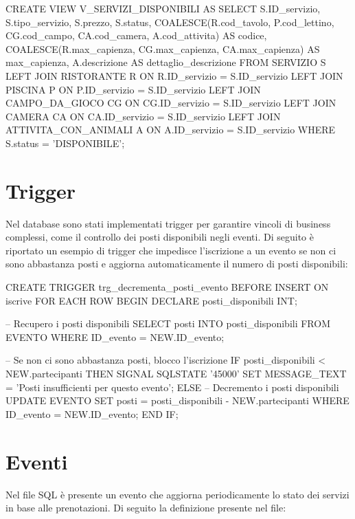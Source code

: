 \documentclass[a4paper,12pt]{report}
\begin{document}
\begin{sqlcode}[caption={},label={lst:view}]
CREATE VIEW V_SERVIZI_DISPONIBILI AS
SELECT
S.ID_servizio,
S.tipo_servizio,
S.prezzo,
S.status,
COALESCE(R.cod_tavolo, P.cod_lettino, CG.cod_campo, CA.cod_camera, A.cod_attivita) AS codice,
COALESCE(R.max_capienza, CG.max_capienza, CA.max_capienza) AS max_capienza,
A.descrizione AS dettaglio_descrizione
FROM SERVIZIO S
LEFT JOIN RISTORANTE R ON R.ID_servizio = S.ID_servizio
LEFT JOIN PISCINA P ON P.ID_servizio = S.ID_servizio
LEFT JOIN CAMPO_DA_GIOCO CG ON CG.ID_servizio = S.ID_servizio
LEFT JOIN CAMERA CA ON CA.ID_servizio = S.ID_servizio
LEFT JOIN ATTIVITA_CON_ANIMALI A ON A.ID_servizio = S.ID_servizio
WHERE S.status = 'DISPONIBILE';
\end{sqlcode}

\section{Trigger}

Nel database sono stati implementati trigger per garantire vincoli di business complessi, come il controllo dei posti disponibili
negli eventi. Di seguito è riportato un esempio di trigger che impedisce l'iscrizione a un evento se non ci sono abbastanza posti
e aggiorna automaticamente il numero di posti disponibili:

\begin{sqlcode}[caption={},label={lst:trigger}]
CREATE TRIGGER trg_decrementa_posti_evento
BEFORE INSERT ON iscrive
FOR EACH ROW
BEGIN
DECLARE posti_disponibili INT;

-- Recupero i posti disponibili
SELECT posti
INTO posti_disponibili
FROM EVENTO
WHERE ID_evento = NEW.ID_evento;

-- Se non ci sono abbastanza posti, blocco l'iscrizione
IF posti_disponibili < NEW.partecipanti THEN
SIGNAL SQLSTATE '45000'
SET MESSAGE_TEXT = 'Posti insufficienti per questo evento';
ELSE
-- Decremento i posti disponibili
UPDATE EVENTO
SET posti = posti_disponibili - NEW.partecipanti
WHERE ID_evento = NEW.ID_evento;
END IF;
\end{sqlcode}

\section{Eventi}
Nel file SQL è presente un evento che aggiorna periodicamente lo stato dei servizi in base alle prenotazioni. Di seguito la definizione presente nel file:
\end{document}
